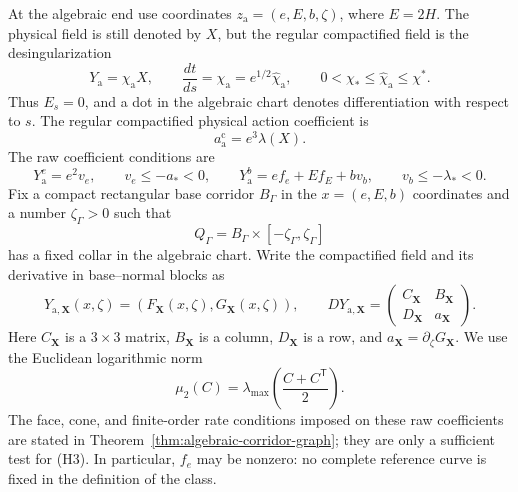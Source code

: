 \documentclass[11pt]{amsart}
\numberwithin{equation}{section}
\theoremstyle{definition}
\theoremstyle{remark}
\begin{document}
At the algebraic end use coordinates
$z_{\mathrm a}=(e,E,b,\zeta)$, where $E=2H$.  The physical field is still
denoted by $X$, but the regular compactified field is the desingularization
\[
 Y_{\mathrm a}=\chi_{\mathrm a}X,
 \qquad \frac{dt}{ds}=\chi_{\mathrm a}
 =e^{1/2}\widehat\chi_{\mathrm a},
 \qquad 0<\chi_*\le\widehat\chi_{\mathrm a}\le\chi^*.
\]
Thus $E_s=0$, and a dot in the algebraic chart denotes differentiation
with respect to $s$.  The regular compactified physical action coefficient
is
\begin{equation}\label{eq:alg-density}
 a_{\mathrm a}^{\mathrm c}=e^3\lambda(X).
\end{equation}
The raw coefficient conditions are
\begin{equation}\label{eq:alg-factorization}
 Y_{\mathrm a}^e=e^2v_e,\qquad v_e\le-a_*<0,
 \qquad
 Y_{\mathrm a}^b=e f_e+E f_E+bv_b,
 \qquad v_b\le-\lambda_*<0.
\end{equation}
Fix a compact rectangular base corridor $B_\Gamma$ in the
$x=(e,E,b)$ coordinates and a number $\zeta_\Gamma>0$ such that
\begin{equation}\label{eq:alg-corridor}
 Q_\Gamma=B_\Gamma\times[-\zeta_\Gamma,\zeta_\Gamma]
\end{equation}
has a fixed collar in the algebraic chart.  Write the compactified field
and its derivative in base--normal blocks as
\begin{equation}\label{eq:alg-block-field}
 Y_{\mathrm a,\mathbf X}(x,\zeta)
   =(F_{\mathbf X}(x,\zeta),G_{\mathbf X}(x,\zeta)),
 \qquad
 DY_{\mathrm a,\mathbf X}
 =\begin{pmatrix}C_{\mathbf X}&B_{\mathbf X}\\
                  D_{\mathbf X}&a_{\mathbf X}\end{pmatrix}.
\end{equation}
Here $C_{\mathbf X}$ is a $3\times3$ matrix,
$B_{\mathbf X}$ is a column, $D_{\mathbf X}$ is a row, and
$a_{\mathbf X}=\partial_\zeta G_{\mathbf X}$.  We use the Euclidean
logarithmic norm
\begin{equation}\label{eq:alg-logarithmic-norm}
 \mu_2(C)=\lambda_{\max}\!\left(\frac{C+C^{\mathsf T}}2\right).
\end{equation}
The face, cone, and finite-order rate conditions imposed on these raw
coefficients are stated in
Theorem~\ref{thm:algebraic-corridor-graph}; they are only a sufficient
test for \textup{(H3)}.  In particular, $f_e$ may
be nonzero: no complete reference curve is fixed in the definition of the
class.
\end{document}
